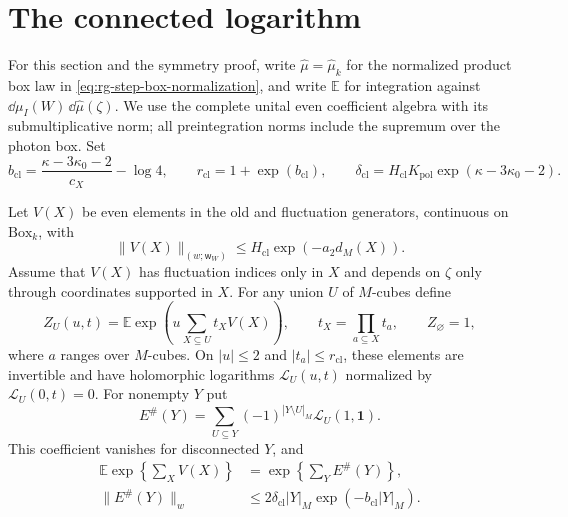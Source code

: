 \section{The connected logarithm}
\label{subsec:rgnl-cluster-logarithm}

For this section and the symmetry proof, write
$\widehat\mu=\widehat\mu_k$ for the normalized product box law in
\eqref{eq:rg-step-box-normalization}, and write $\mathbb E$ for
integration against $\dd\mu_I(W)\,\dd\widehat\mu(\zeta)$.
We use the complete unital even coefficient algebra with its
submultiplicative norm; all preintegration norms include the supremum
over the photon box.
Set
\[
 b_{\mathrm{cl}}=\frac{\kappa-3\kappa_0-2}{c_X}-\log4,\qquad
 r_{\mathrm{cl}}=1+\exp(b_{\mathrm{cl}}),\qquad
 \delta_{\mathrm{cl}}=H_{\mathrm{cl}}K_{\mathrm{pol}}
                                      \exp(\kappa-3\kappa_0-2).
\]

\begin{proposition}\label{prop:rgnl-cluster-logarithm}
Let $V(X)$ be even elements in the old and fluctuation
generators, continuous on $\mathrm{Box}_k$, with
\[
 \|V(X)\|_{(w;\mathsf w_W)}
                       \le H_{\mathrm{cl}}\exp(-a_2d_M(X)).
\]
Assume that $V(X)$ has fluctuation indices only in $X$ and
depends on $\zeta$ only through coordinates supported in $X$.
For any union $U$ of $M$-cubes define
\begin{equation}\label{eq:rgnl-regional-integral}
 Z_U(u,t)=\mathbb E\exp\left(u\sum_{X\subseteq U}t_XV(X)\right),
 \qquad t_X=\prod_{a\subseteq X}t_a,\qquad Z_\varnothing=1,
\end{equation}
where $a$ ranges over $M$-cubes. On $|u|\le2$ and
$|t_a|\le r_{\mathrm{cl}}$, these elements are invertible
and have holomorphic logarithms $\mathcal L_U(u,t)$ normalized by
$\mathcal L_U(0,t)=0$.
For nonempty $Y$ put
\begin{equation}\label{eq:rgnl-log-activity}
 E^\#(Y)=\sum_{U\subseteq Y}(-1)^{|Y\setminus U|_M}
                                      \mathcal L_U(1,\mathbf1).
\end{equation}
This coefficient vanishes for disconnected $Y$, and
\begin{align}
 \mathbb E\exp\left\{\sum_XV(X)\right\}
       &=\exp\left\{\sum_YE^\#(Y)\right\},
                                      \label{eq:rgnl-log-identity}\\
 \|E^\#(Y)\|_w
       &\le2\delta_{\mathrm{cl}}|Y|_M
                                 \exp(-b_{\mathrm{cl}}|Y|_M).
                                      \label{eq:rgnl-log-bound}
\end{align}
\end{proposition}

